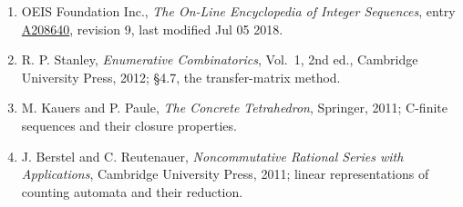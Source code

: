 \documentclass[11pt]{article}
\theoremstyle{definition}
\begin{document}
\begin{enumerate}

\item OEIS Foundation Inc., \emph{The On-Line Encyclopedia of Integer Sequences}, entry \href{https://oeis.org/A208640}{A208640}, revision 9, last modified Jul 05 2018.

\item R. P. Stanley, \emph{Enumerative Combinatorics}, Vol.~1, 2nd ed., Cambridge University Press, 2012; \S4.7, the transfer-matrix method.

\item M. Kauers and P. Paule, \emph{The Concrete Tetrahedron}, Springer, 2011; C-finite sequences and their closure properties.

\item J. Berstel and C. Reutenauer, \emph{Noncommutative Rational Series with Applications}, Cambridge University Press, 2011; linear representations of counting automata and their reduction.

\end{enumerate}
\end{document}
